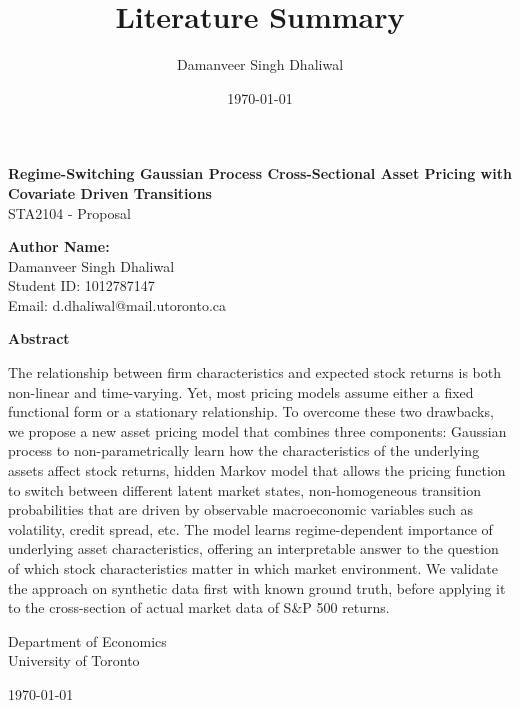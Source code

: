 \documentclass[11pt]{article}
\title{Literature Summary}
\author{Damanveer Singh Dhaliwal}
\date{\today}
\begin{document}
\begin{titlepage}
    \centering
    \vspace{0.5cm}

    \Large{\textbf{Regime-Switching Gaussian Process Cross-Sectional Asset Pricing with Covariate Driven Transitions}}\\  
    \Large{STA2104 - Proposal}\\  
    \vspace{0.5cm}

    \Large{\textbf{Author Name:}}\\
    \Large{Damanveer Singh Dhaliwal}\\
    \Large{Student ID: 1012787147} \\
    \Large{Email: d.dhaliwal@mail.utoronto.ca}

    \vspace{2cm}
    \textbf{Abstract} \\
    \vspace{0.5cm}
    \begin{minipage}{\textwidth}
    \normalsize
    The relationship between firm characteristics and expected stock returns is both non-linear and time-varying. Yet, most pricing models assume either a fixed functional form or a stationary relationship. To overcome these two drawbacks, we propose a new asset pricing model that combines three components: Gaussian process to non-parametrically learn how the characteristics of the underlying assets affect stock returns, hidden Markov model that allows the pricing function to switch between different latent market states, non-homogeneous transition probabilities that are driven by observable macroeconomic variables such as volatility, credit spread, etc. The model learns regime-dependent importance of underlying asset characteristics, offering an interpretable answer to the question of which stock characteristics matter in which market environment. We validate the approach on synthetic data first with known ground truth, before applying it to the cross-section of actual market data of S\&P 500 returns.
    \end{minipage}

    \vfill
    
    \large{Department of Economics}\\
    \large{University of Toronto}
    
    \vspace{0.8cm}
    
    \large{\today}
\end{titlepage}
\vspace{-2em}
\end{document}
